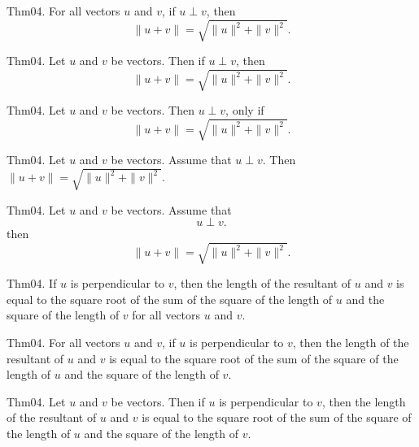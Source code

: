 \documentclass{article}
\begin{document}
Thm04. For all vectors $u$ and $v$, if $u \perp v$, then $$\| u + v \| = \sqrt{ \| u \| ^{ 2}+ \| v \| ^{ 2}}.$$

Thm04. Let $u$ and $v$ be vectors. Then if $u \perp v$, then $$\| u + v \| = \sqrt{ \| u \| ^{ 2}+ \| v \| ^{ 2}}.$$

Thm04. Let $u$ and $v$ be vectors. Then $u \perp v$, only if $$\| u + v \| = \sqrt{ \| u \| ^{ 2}+ \| v \| ^{ 2}}.$$

Thm04. Let $u$ and $v$ be vectors. Assume that $u \perp v$. Then $\| u + v \| = \sqrt{ \| u \| ^{ 2}+ \| v \| ^{ 2}}$.

Thm04. Let $u$ and $v$ be vectors. Assume that $$u \perp v.$$ then $$\| u + v \| = \sqrt{ \| u \| ^{ 2}+ \| v \| ^{ 2}}.$$

Thm04. If $u$ is perpendicular to $v$, then the length of the resultant of $u$ and $v$ is equal to the square root of the sum of the square of the length of $u$ and the square of the length of $v$ for all vectors $u$ and $v$.

Thm04. For all vectors $u$ and $v$, if $u$ is perpendicular to $v$, then the length of the resultant of $u$ and $v$ is equal to the square root of the sum of the square of the length of $u$ and the square of the length of $v$.

Thm04. Let $u$ and $v$ be vectors. Then if $u$ is perpendicular to $v$, then the length of the resultant of $u$ and $v$ is equal to the square root of the sum of the square of the length of $u$ and the square of the length of $v$.
\end{document}
